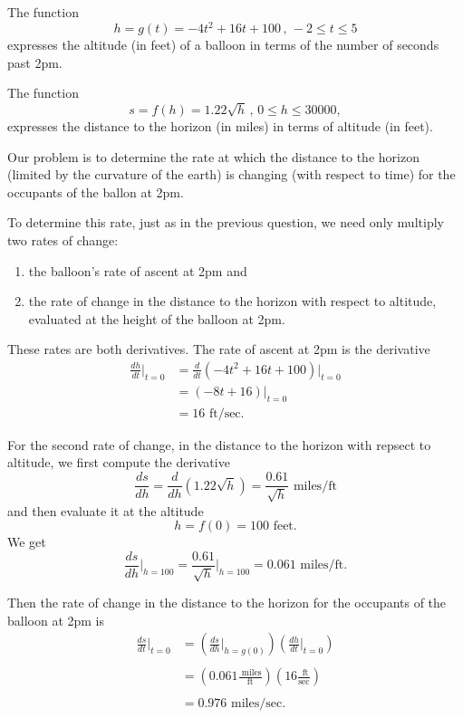 \documentclass{ximera}
\begin{document}
\begin{example}  \label{Ex9dfLEReEWM}
The function
\[
     h = g(t) = -4t^2 + 16t + 100 \, , \, -2\leq t \leq 5
\]
expresses the altitude (in feet) of a balloon in terms of the number of seconds past 2pm. 

The function
\[
   s = f(h) = 1.22\sqrt{h} \, , \, 0\leq h \leq 30000,
\]
expresses the distance to the horizon (in miles) in terms of altitude (in feet).

Our problem is to determine the rate at which the distance to the horizon (limited by the curvature of the earth) is changing (with respect to time) for the occupants of the ballon at 2pm.

\begin{explanation}
To determine this rate, just as in the previous question, we need only multiply two rates of change:

\begin{enumerate}
\item the balloon's rate of ascent at 2pm and

\item the rate of change in the distance to the horizon with respect to altitude, evaluated at the height of the balloon at 2pm. 
\end{enumerate}

These rates are both derivatives. The rate of ascent at 2pm is the derivative
\begin{align*}
\frac{dh}{dt}\Big|_{t=0} &= \frac{d}{dt}\left( -4t^2 + 16t + 100 \right) \Big|_{t=0} \\
                                     &= (-8t +16)\Big|_{t=0} \\
                                     &= 16 \text{ ft/sec}.
\end{align*}

For the second rate of change, in the distance to the horizon with repsect to altitude, we first compute the derivative
\[
  \frac{ds}{dh} = \frac{d}{dh} \left( 1.22\sqrt{h} \right) = \frac{0.61}{\sqrt{h}} \text{ miles/ft} 
\]
and then evaluate it at the altitude
\[
 h = f(0) = 100 \text{ feet} .
\]
We get
\[
    \frac{ds}{dh}\Big|_{h=100} =  \frac{0.61}{\sqrt{h}}\Big|_{h=100} = 0.061 \text{ miles/ft}.
\]

Then the rate of change in the distance to the horizon for the occupants of the balloon at 2pm is
\begin{align*}
  \frac{ds}{dt}\Big|_{t=0} &=  \left( \frac{ds}{dh}\Big|_{h=g(0)} \right)  \left( \frac{dh}{dt}\Big|_{t=0} \right) \\ \\
                                      &= \left(   0.061 \frac{\text{ miles}}{\text{ft}} \right) \left(   16 \frac{\text{ ft}}{\text{sec}}    \right) \\ \\
                                       &= 0.976 \text{ miles/sec} .
\end{align*}


\end{explanation}
\end{example}
\end{document}
